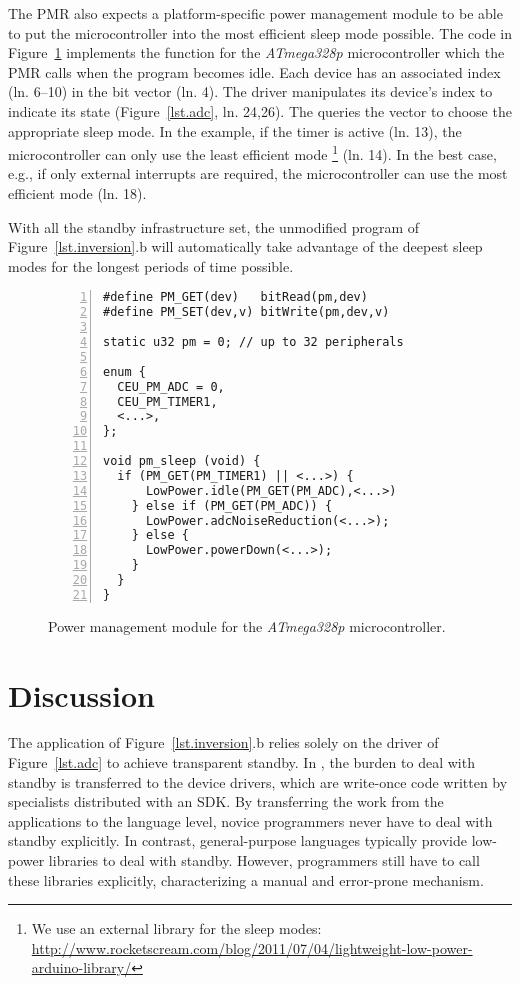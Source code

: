 The PMR also expects a platform-specific power management module to be able to
put the microcontroller into the most efficient sleep mode possible.
%
The code in Figure~\ref{lst.pm} implements the  function for
the \emph{ATmega328p} microcontroller which the PMR calls when the program
becomes idle.
%
Each device has an associated index (ln. 6--10) in the  bit vector
(ln. 4).
%
The driver manipulates its device's index to indicate its state
(Figure~\ref{lst.adc}, ln. 24,26).
%
The  queries the vector to choose the appropriate sleep mode.
In the example, if the timer is active (ln. 13), the microcontroller can only
use the least efficient mode%
\footnote{
    We use an external library for the sleep modes:
    \url{http://www.rocketscream.com/blog/2011/07/04/lightweight-low-power-arduino-library/}
}
(ln. 14).
%
In the best case, e.g., if only external interrupts are required, the
microcontroller can use the most efficient mode (ln. 18).

With all the standby infrastructure set, the unmodified program of
Figure~\ref{lst.inversion}.b will automatically take advantage of the deepest
sleep modes for the longest periods of time possible.

\begin{figure}[t]
\begin{lstlisting}[numbers=left]
#define PM_GET(dev)   bitRead(pm,dev)
#define PM_SET(dev,v) bitWrite(pm,dev,v)

static u32 pm = 0; // up to 32 peripherals

enum {
  CEU_PM_ADC = 0,
  CEU_PM_TIMER1,
  <...>,
};

void pm_sleep (void) {
  if (PM_GET(PM_TIMER1) || <...>) {
      LowPower.idle(PM_GET(PM_ADC),<...>)
    } else if (PM_GET(PM_ADC)) {
      LowPower.adcNoiseReduction(<...>);
    } else {
      LowPower.powerDown(<...>);
    }
  }
}
\end{lstlisting}
\caption{ Power management module for the \emph{ATmega328p} microcontroller.
\label{lst.pm}
}
\end{figure}

\section{Discussion}

The application of Figure~\ref{lst.inversion}.b relies solely on the driver of
Figure~\ref{lst.adc} to achieve transparent standby.
%
In \CEU, the burden to deal with standby is transferred to the device drivers,
which are write-once code written by specialists distributed with an SDK.
By transferring the work from the applications to the language level, novice
programmers never have to deal with standby explicitly.
%
In contrast, general-purpose languages typically provide low-power libraries to
deal with standby.
However, programmers still have to call these libraries explicitly,
characterizing a manual and error-prone mechanism.

